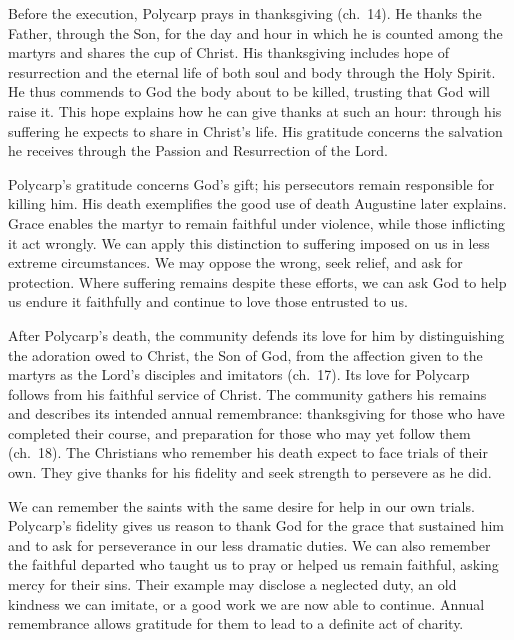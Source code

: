 Before the execution, Polycarp prays in thanksgiving (ch.~14). He thanks the Father, through the Son, for the day and hour in which he is counted among the martyrs and shares the cup of Christ. His thanksgiving includes hope of resurrection and the eternal life of both soul and body through the Holy Spirit. He thus commends to God the body about to be killed, trusting that God will raise it. This hope explains how he can give thanks at such an hour: through his suffering he expects to share in Christ's life. His gratitude concerns the salvation he receives through the Passion and Resurrection of the Lord.

Polycarp's gratitude concerns God's gift; his persecutors remain responsible for killing him. His death exemplifies the good use of death Augustine later explains. Grace enables the martyr to remain faithful under violence, while those inflicting it act wrongly. We can apply this distinction to suffering imposed on us in less extreme circumstances. We may oppose the wrong, seek relief, and ask for protection. Where suffering remains despite these efforts, we can ask God to help us endure it faithfully and continue to love those entrusted to us.

After Polycarp's death, the community defends its love for him by distinguishing the adoration owed to Christ, the Son of God, from the affection given to the martyrs as the Lord's disciples and imitators (ch.~17). Its love for Polycarp follows from his faithful service of Christ. The community gathers his remains and describes its intended annual remembrance: thanksgiving for those who have completed their course, and preparation for those who may yet follow them (ch.~18). The Christians who remember his death expect to face trials of their own. They give thanks for his fidelity and seek strength to persevere as he did.

We can remember the saints with the same desire for help in our own trials. Polycarp's fidelity gives us reason to thank God for the grace that sustained him and to ask for perseverance in our less dramatic duties. We can also remember the faithful departed who taught us to pray or helped us remain faithful, asking mercy for their sins. Their example may disclose a neglected duty, an old kindness we can imitate, or a good work we are now able to continue. Annual remembrance allows gratitude for them to lead to a definite act of charity.

